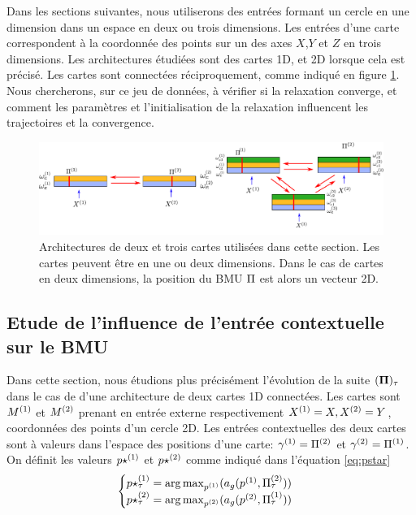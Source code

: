 Dans les sections suivantes, nous utiliserons des entrées formant un cercle en une dimension dans un espace en deux ou trois dimensions. Les entrées d'une carte correspondent à la coordonnée des points sur un des axes $X$,$Y$ et $Z$ en trois dimensions.
Les architectures étudiées sont des cartes 1D, et 2D lorsque cela est précisé. Les cartes sont connectées réciproquement, comme indiqué en figure \ref{fig:archis}.
Nous chercherons, sur ce jeu de données, à vérifier si la relaxation converge, et comment les paramètres et l'initialisation de la relaxation influencent les trajectoires et la convergence.
\begin{figure}
\centering
\includegraphics[width=\textwidth]{archis}
\caption{Architectures de deux et trois cartes utilisées dans cette section. Les cartes peuvent être en une ou deux dimensions. Dans le cas de cartes en deux dimensions, la position du BMU $\Pi$ est alors un vecteur 2D.}
\label{fig:archis}
\end{figure}

\subsection{Etude de l'influence de l'entrée contextuelle sur le BMU}\label{sec:cont}

Dans cette section, nous étudions plus précisément l'évolution de la suite $(\mathbf{\Pi})_{\tau}$ dans le cas de d'une architecture de deux cartes 1D connectées. Les cartes sont $M^{({1})}$ et $M^{({2})}$ prenant en entrée externe respectivement $X^{({1})} = X, X^{({2})} = Y$, coordonnées des points d'un cercle 2D.
Les entrées contextuelles des deux cartes sont à valeurs dans l'espace des positions d'une carte: $\gamma^{({1})} = \Pi^{({2})}$ et $\gamma^{({2})} = \Pi^{({1})}$.
On définit les valeurs $p\star^{({1})}$ et $p\star^{({2})}$ comme indiqué dans l'équation \ref{eq:pstar}
\begin{equation} 
\begin{cases}
	p\star^{({1})}_{\tau} = \operatorname*{arg\,max}_{p^{({1})}}(a_g(p^{({1})},\Pi^{({2})}_{\tau})) \\
	p\star^{({2})}_{\tau} = \operatorname*{arg\,max}_{p^{({2})}}(a_g(p^{({2})},\Pi^{({1})}_{\tau})) \\
\end{cases}
\end{equation}

